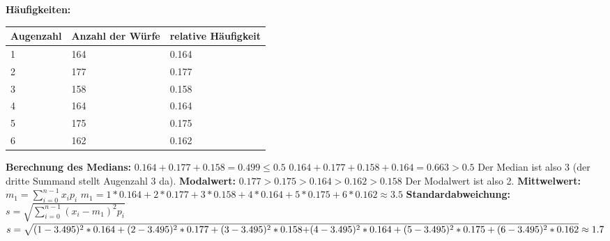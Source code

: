\documentclass[fleqn,a4paper,12pt]{article}
\begin{document}
  \textbf{Häufigkeiten:}
  \begin{center}
    \begin{tabular}{ | l | l | l | }
      \hline
      Augenzahl & Anzahl der Würfe & relative Häufigkeit \\ \hline
      1 & 164 & 0.164 \\ \hline
      2 & 177 & 0.177 \\ \hline
      3 & 158 & 0.158 \\ \hline
      4 & 164 & 0.164 \\ \hline
      5 & 175 & 0.175 \\ \hline
      6 & 162 & 0.162 \\ \hline
    \end{tabular}  
  \end{center}
  \textbf{Berechnung des Medians:} \newline
  $0.164 + 0.177 + 0.158 = 0.499 \leq 0.5$ \newline
  $0.164 + 0.177 + 0.158 + 0.164 = 0.663 > 0.5$ \newline
  Der Median ist also 3 (der dritte Summand stellt Augenzahl 3 da). \newline
  \textbf{Modalwert:} \newline
  $0.177 > 0.175 > 0.164 > 0.162 > 0.158$ \newline
  Der Modalwert ist also 2. \newline
  \textbf{Mittwelwert:} \newline 
  $m_1 = \sum_{i=0}^{n-1} x_i p_i$ \newline
  $m_1 = 1*0.164 + 2*0.177 + 3*0.158 + 4*0.164 + 5*0.175 + 6*0.162 \approx 3.5$ \newline
  \textbf{Standardabweichung:} \newline
  $s = \sqrt{\sum_{i=0}^{n-1} (x_i-m_1)^2 p_i}$ \newline
  $s = \sqrt{(1-3.495)^2*0.164 + (2-3.495)^2*0.177 + (3-3.495)^2*0.158} \\\overline{+ (4-3.495)^2*0.164 + (5-3.495)^2*0.175 + (6-3.495)^2*0.162} \approx 1.7$ \newpage
\end{document}
